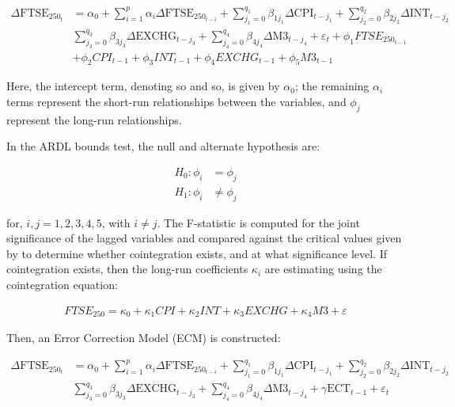 \documentclass[11pt,a4paper]{article}
\newcommand{\citeboth}[1]{\citeauthor{#1} \citep{#1}}
\begin{document}
\begin{align*}
    \Delta \text{FTSE}_{250_t} &= \alpha_0 + \sum_{i=1}^{p} \alpha_i \Delta \text{FTSE}_{250_{t-i}} + \sum_{j_{1}=0}^{q_1} \beta_{1j_{1}} \Delta \text{CPI}_{t-j_{1}} + \sum_{j_{2}=0}^{q_2} \beta_{2j_{2}} \Delta \text{INT}_{t-j_{2}} \\
                               & \sum_{j_{3}=0}^{q_3} \beta_{3j_{3}} \Delta \text{EXCHG}_{t-j_{3}} + \sum_{j_{4}=0}^{q_4} \beta_{4j_{4}} \Delta \text{M3}_{t-j_{4}} + \varepsilon_t + \phi_{1} FTSE_{250_{t-1}} \\
                               & + \phi_{2} CPI_{t-1} + \phi_{3} INT_{t-1} +\phi_4 EXCHG_{t-1} + \phi_5 M3_{t-1}
\end{align*}

Here, the intercept term, denoting so and so, is given by $\alpha_0$; the 
remaining $\alpha_i$ terms represent the short-run relationships 
between the variables, and $\phi_j$ represent the long-run relationships. 

In the ARDL bounds test, the null and alternate hypothesis are:
 
\begin{align*}
    H_{0}: \phi_i &= \phi_j\\
    H_{1}: \phi_i &\neq \phi_j
\end{align*}

for, $i,j = 1,2,3,4,5$, with $i\neq j$. The F-statistic is computed for the joint
significance of the lagged variables and compared against the critical values
given by \citeboth{pesaran2001} to determine whether cointegration exists, 
and at what significance level. If cointegration exists, then 
the long-run coefficients $\kappa_i$ are estimating using the cointegration equation:

\begin{align}
    FTSE_{250} = \kappa_0 + \kappa_1 CPI + \kappa_2 INT + \kappa_3 EXCHG + \kappa_4 M3 + \varepsilon \label{eq:two}
\end{align}

Then, an Error Correction Model (ECM) is constructed:

\begin{align*}
    \Delta \text{FTSE}_{250_t} &= \alpha_0 + \sum_{i=1}^{p} \alpha_i \Delta \text{FTSE}_{250_{t-i}} + \sum_{j_{1}=0}^{q_1} \beta_{1j_{1}} \Delta \text{CPI}_{t-j_{1}} + \sum_{j_{2}=0}^{q_2} \beta_{2j_{2}} \Delta \text{INT}_{t-j_{2}} \\
                               & \sum_{j_{3}=0}^{q_3} \beta_{3j_{3}} \Delta \text{EXCHG}_{t-j_{3}} + \sum_{j_{4}=0}^{q_4} \beta_{4j_{4}} \Delta \text{M3}_{t-j_{4}} + \gamma\text{ECT}_{t-1} + \varepsilon_t
\end{align*}
\end{document}
